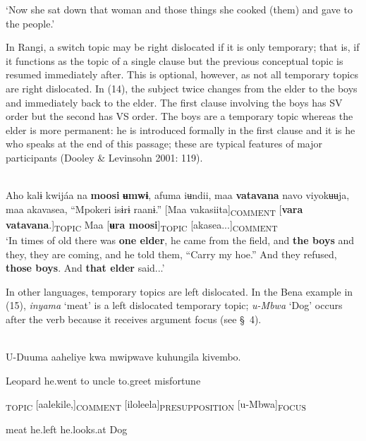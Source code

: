 \documentclass[output=paper]{langsci/langscibook}
\begin{document}
\begin{styleLangSciTranslation}
\glt \textup{‘}\textup{Now she sat down that woman and those things she cooked (them) and gave to the people.’}
\z

In Rangi, a switch topic may be right dislocated if it is only temporary; that is, if it functions as the topic of a single clause but the previous conceptual topic is resumed immediately after. This is optional, however, as not all temporary topics are right dislocated. In (14), the subject twice changes from the elder to the boys and immediately back to the elder. The first clause involving the boys has SV order but the second has VS order. The boys are a temporary topic whereas the elder is more permanent: he is introduced formally in the first clause and it is he who speaks at the end of this passage; these are typical features of major participants (Dooley \& Levinsohn 2001: 119).

\ea\label{ex:}
\\
\gll Aho kalɨ kwijáa na \textbf{moosi }\textbf{ʉ}\textbf{mw}\textbf{ɨ}, afuma iʉndii, maa \textbf{vatavana} navo viyokʉʉja, maa akavasea, “Mpokeri isɨrɨ raanɨ.” [Maa vakasiita]\textsubscript{COMME}\textsubscript{NT} [\textbf{vara vatavana}.]\textsubscript{TOPIC} Maa [\textbf{ʉ}\textbf{ra moosi}]\textsubscript{TOPIC} [akasea...]\textsubscript{COMMENT}\\
\glt \textup{‘}\textup{In times of old there was }\textbf{\textup{one elder}}\textup{, he came from the field, and }\textbf{\textup{the boys}}\textup{ and they, they are coming, and he told them, “Carry my hoe.” And }\textup{they refused, }\textbf{\textup{those boys}}\textup{. And }\textbf{\textup{that elder}}\textup{ said...’}
\z

In other languages, temporary topics are left dislocated. In the Bena example in (15), \emph{inyama} ‘meat’ is a left dislocated temporary topic; \textit{u}\textit{\nobreakdash-Mbwa} ‘Dog’ occurs after the verb because it receives argument focus (see §~4).

\ea\label{ex:}
\\
\gll U-Duuma aaheliye kwa mwipwave kuhungila kivembo.\\
\begin{styleUntitledi}
Leopard he.went to uncle to.greet misfortune
\end{styleUntitledi}

\gll [Inyama]\textsubscript{TOPIC} [aalekile,]\textsubscript{COMMENT} [iloleela]\textsubscript{PRESUPPOSITION} [u-Mbwa]\textsubscript{FOCUS}\\
\begin{styleUntitledi}
meat he.left he.looks.at Dog
\end{styleUntitledi}


\end{styleLangSciTranslation}
\end{document}
